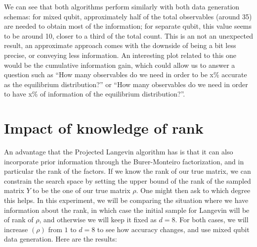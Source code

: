 \documentclass[12pt]{memoir}
\newcommand{\rhorank}[0]{\text{rank}$(\rho) $ }
\begin{document}
We can see that both algorithms perform similarly with both data generation schemas: for mixed qubit, approximately half of the total observables (around 35) are needed to obtain most of the information; for separate qubit, this value seems to be around 10, closer to a third of the total count. This is an not an unexpected result, an approximate approach comes with the downside of being a bit less precise, or conveying less information. An interesting plot related to this one would be the cumulative information gain, which could allow us to answer a question such as ``How many observables do we need in order to be x\% accurate as the equilibrium distribution?'' or ``How many observables do we need in order to have x\% of information of the equilibrium distribution?''.

\section{Impact of knowledge of rank}\label{section:comp-rank-info}
An advantage that the Projected Langevin algorithm has is that it can also incorporate prior information through the Burer-Monteiro factorization, and in particular the rank of the factors. If we know the rank of our true matrix, we can constrain the search space by setting the upper bound of the rank of the sampled matrix $Y$ to be the one of our true matrix $\rho$. One might then ask to which degree this helps. In this experiment, we will be comparing the situation where we have information about the rank, in which case the initial sample for Langevin will be of rank of $\rho$, and otherwise we will keep it fixed as $d=8$. For both cases, we will increase \rhorank from $1$ to $d=8$ to see how accuracy changes, and use mixed qubit data generation. Here are the results:
\end{document}
